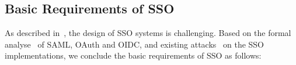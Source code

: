 \subsection{Basic Requirements of SSO}
\label{subsec:basicrequirements}
As described in~\cite{SPRESSO}, the design of SSO systems is challenging.
 Based on the formal analyse~\cite{ArmandoCCCT08,FettKS16, FettKS17} of SAML, OAuth and OIDC, and existing attacks~\cite{SomorovskyMSKJ12,WangCW12,ArmandoCCCPS13,ZhouE14,WangZLLYLG15,WangZLG16,YangLLZH16,MainkaMS16,MohsenS16,MainkaMSW17,YangLCZ18,YangLS17,ShiWL19} on the SSO implementations,
we conclude the basic requirements of SSO as follows:
